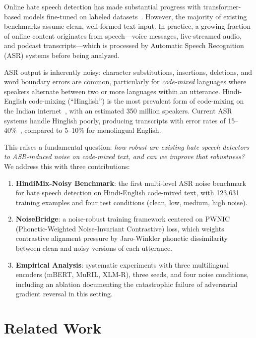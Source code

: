 \documentclass[conference]{IEEEtran}
\begin{document}
Online hate speech detection has made substantial progress with transformer-based models fine-tuned on labeled datasets~\cite{davidson2017automated, mathew2021hatexplain}. However, the majority of existing benchmarks assume clean, well-formed text input. In practice, a growing fraction of online content originates from speech---voice messages, live-streamed audio, and podcast transcripts---which is processed by Automatic Speech Recognition (ASR) systems before being analyzed.

ASR output is inherently noisy: character substitutions, insertions, deletions, and word boundary errors are common, particularly for \textit{code-mixed} languages where speakers alternate between two or more languages within an utterance. Hindi-English code-mixing (``Hinglish'') is the most prevalent form of code-mixing on the Indian internet~\cite{barman2014code}, with an estimated 350 million speakers. Current ASR systems handle Hinglish poorly, producing transcripts with error rates of 15--40\%~\cite{shah2020learning}, compared to 5--10\% for monolingual English.

This raises a fundamental question: \textit{how robust are existing hate speech detectors to ASR-induced noise on code-mixed text, and can we improve that robustness?} We address this with three contributions:

\begin{enumerate}
\item \textbf{HindiMix-Noisy Benchmark}: the first multi-level ASR noise benchmark for hate speech detection on Hindi-English code-mixed text, with 123,631 training examples and four test conditions (clean, low, medium, high noise).

\item \textbf{NoiseBridge}: a noise-robust training framework centered on PWNIC (Phonetic-Weighted Noise-Invariant Contrastive) loss, which weights contrastive alignment pressure by Jaro-Winkler phonetic dissimilarity between clean and noisy versions of each utterance.

\item \textbf{Empirical Analysis}: systematic experiments with three multilingual encoders (mBERT, MuRIL, XLM-R), three seeds, and four noise conditions, including an ablation documenting the catastrophic failure of adversarial gradient reversal in this setting.
\end{enumerate}

\section{Related Work}
\end{document}
